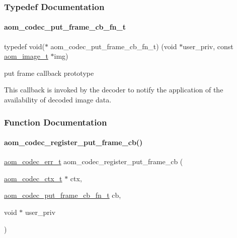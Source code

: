 \subsubsection{Typedef Documentation}
\mbox{\label{group__cap__put__frame_gade62af02658acd724fda731b6300eec7}} 
\paragraph{\texorpdfstring{aom\+\_\+codec\+\_\+put\+\_\+frame\+\_\+cb\+\_\+fn\+\_\+t}{aom\_codec\_put\_frame\_cb\_fn\_t}}
{\footnotesize\ttfamily typedef void($\ast$ aom\+\_\+codec\+\_\+put\+\_\+frame\+\_\+cb\+\_\+fn\+\_\+t) (void $\ast$user\+\_\+priv, const \hyperlink{aom__image_8h_a5409ae8fdb326fe1cc32622ef4e23748}{aom\+\_\+image\+\_\+t} $\ast$img)}



put frame callback prototype 

This callback is invoked by the decoder to notify the application of the availability of decoded image data. 

\subsubsection{Function Documentation}
\mbox{\label{group__cap__put__frame_ga0d6672fef284041573a29b76a0a5ef1b}} 
\paragraph{\texorpdfstring{aom\+\_\+codec\+\_\+register\+\_\+put\+\_\+frame\+\_\+cb()}{aom\_codec\_register\_put\_frame\_cb()}}
{\footnotesize\ttfamily \hyperlink{group__codec_gaaae61e0f8663e6137f1e228757248e7c}{aom\+\_\+codec\+\_\+err\+\_\+t} aom\+\_\+codec\+\_\+register\+\_\+put\+\_\+frame\+\_\+cb (\begin{DoxyParamCaption}\item[{\hyperlink{group__codec_ga9a1d27f9742d9f70783e3c6cb849b5b4}{aom\+\_\+codec\+\_\+ctx\+\_\+t} $\ast$}]{ctx,  }\item[{\hyperlink{group__cap__put__frame_gade62af02658acd724fda731b6300eec7}{aom\+\_\+codec\+\_\+put\+\_\+frame\+\_\+cb\+\_\+fn\+\_\+t}}]{cb,  }\item[{void $\ast$}]{user\+\_\+priv }\end{DoxyParamCaption})}



